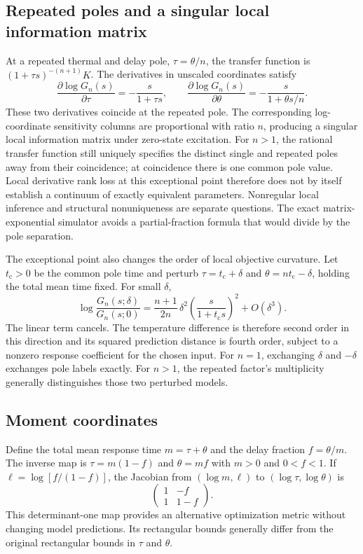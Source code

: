 \documentclass[11pt]{article}
\begin{document}
\subsection{Repeated poles and a singular local information matrix}
At a repeated thermal and delay pole, $\tau=\theta/n$, the transfer function
is $(1+\tau s)^{-(n+1)}K$. The derivatives in unscaled coordinates satisfy
\[
 \frac{\partial\log G_n(s)}{\partial\tau}
 =-\frac{s}{1+\tau s},\qquad
 \frac{\partial\log G_n(s)}{\partial\theta}
 =-\frac{s}{1+\theta s/n}.
\]
These two derivatives coincide at the repeated pole. The corresponding
log-coordinate sensitivity columns are proportional with ratio $n$, producing
a singular local information matrix under zero-state excitation.
For $n>1$, the rational transfer function still uniquely specifies the distinct
single and repeated poles away from their coincidence; at coincidence there is
one common pole value. Local derivative rank loss at this exceptional point
therefore does not by itself establish a continuum of exactly equivalent
parameters. Nonregular local inference and structural nonuniqueness are separate
questions. The exact matrix-exponential simulator avoids a partial-fraction
formula that would divide by the pole separation.

The exceptional point also changes the order of local objective curvature.
Let $t_{\mathrm c}>0$ be the common pole time and perturb
$\tau=t_{\mathrm c}+\delta$ and $\theta=nt_{\mathrm c}-\delta$, holding the
total mean time fixed. For small $\delta$,
\[
 \log\frac{G_n(s;\delta)}{G_n(s;0)}
 =\frac{n+1}{2n}\,\delta^2
   \left(\frac{s}{1+t_{\mathrm c}s}\right)^2+O(\delta^3).
\]
The linear term cancels. The temperature difference is therefore second order
in this direction and its squared prediction distance is fourth order, subject
to a nonzero response coefficient for the chosen input. For $n=1$, exchanging
$\delta$ and $-\delta$ exchanges pole labels exactly. For $n>1$, the repeated
factor's multiplicity generally distinguishes those two perturbed models.

\subsection{Moment coordinates}
Define the total mean response time $m=\tau+\theta$ and the delay fraction
$f=\theta/m$. The inverse map is $\tau=m(1-f)$ and $\theta=mf$ with
$m>0$ and $0<f<1$. If $\ell=\log[f/(1-f)]$, the Jacobian from
$(\log m,\ell)$ to $(\log\tau,\log\theta)$ is
\[
 \begin{pmatrix}1&-f\\1&1-f\end{pmatrix}.
\]
This determinant-one map provides an alternative optimization metric without
changing model predictions. Its rectangular bounds generally differ from the
original rectangular bounds in $\tau$ and $\theta$.
\end{document}
